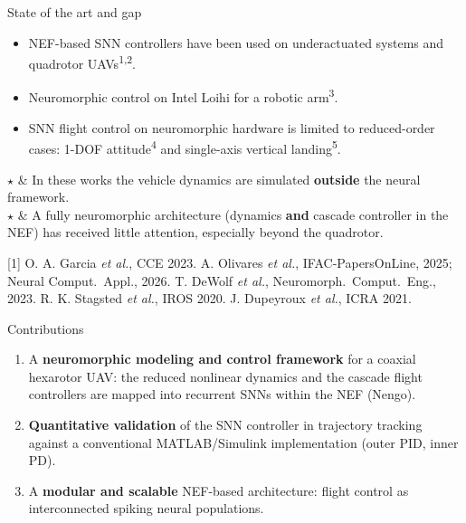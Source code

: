 \documentclass{beamer}
\newcommand{\slideref}[1]{\vfill{\tiny #1}}
\begin{document}
\begin{frame}{State of the art and gap}
\footnotesize
\begin{itemize}
    \item NEF-based SNN controllers have been used on underactuated systems and quadrotor UAVs\textsuperscript{1,2}.
    \item Neuromorphic control on Intel Loihi for a robotic arm\textsuperscript{3}.
    \item SNN flight control on neuromorphic hardware is limited to reduced-order cases: 1-DOF attitude\textsuperscript{4} and single-axis vertical landing\textsuperscript{5}.
\end{itemize}

\begin{table}[h]
    \centering
    \begin{tcolorbox}[
        tabularx = {l | X},
        title = Gap:,
        colback = morado!10,
        colframe = morado!80,
        fontupper=\footnotesize
    ]
        $\star$ & In these works the vehicle dynamics are simulated \textbf{outside} the neural framework.\\
        $\star$ & A fully neuromorphic architecture (dynamics \textbf{and} cascade controller in the NEF) has received little attention, especially beyond the quadrotor.\\
    \end{tcolorbox}
\end{table}

\slideref{[1] O. A. Garcia \emph{et al.}, CCE 2023. \quad [2] A. Olivares \emph{et al.}, IFAC-PapersOnLine, 2025; Neural Comput.\ Appl., 2026. \quad [3] T. DeWolf \emph{et al.}, Neuromorph.\ Comput.\ Eng., 2023. \quad [4] R. K. Stagsted \emph{et al.}, IROS 2020. \quad [5] J. Dupeyroux \emph{et al.}, ICRA 2021.}
\end{frame}

\begin{frame}{Contributions}
\begin{enumerate}
    \item[(i)] A \textbf{neuromorphic modeling and control framework} for a coaxial hexarotor UAV: the reduced nonlinear dynamics and the cascade flight controllers are mapped into recurrent SNNs within the NEF (Nengo).
    \vspace{0.3cm}
    \item[(ii)] \textbf{Quantitative validation} of the SNN controller in trajectory tracking against a conventional MATLAB/Simulink implementation (outer PID, inner PD).
    \vspace{0.3cm}
    \item[(iii)] A \textbf{modular and scalable} NEF-based architecture: flight control as interconnected spiking neural populations.
\end{enumerate}
\end{frame}
\end{document}
